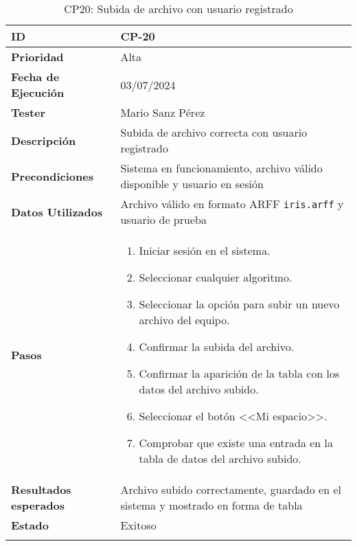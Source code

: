 \begin{longtable}{>{\raggedright\arraybackslash}p{4cm} p{9.5cm}}
    \hline
    \rowcolor{gray!20}
    \textbf{ID} & CP-20\\
    \hline
    \rowcolor{white}
    \textbf{Prioridad} & Alta \\
    \hline
    \rowcolor{gray!20}
    \textbf{Fecha de Ejecución} & 03/07/2024 \\
    \hline
    \rowcolor{white}
    \textbf{Tester} & Mario Sanz Pérez \\
    \hline
    \rowcolor{gray!20}
    \textbf{Descripción} & Subida de archivo correcta con usuario registrado\\
    \hline
    \rowcolor{white}
    \textbf{Precondiciones} & Sistema en funcionamiento, archivo válido disponible y usuario en sesión\\
    \hline
    \rowcolor{white}
    \textbf{Datos Utilizados} & Archivo válido en formato ARFF \texttt{iris.arff} y usuario de prueba\\
    \hline
    \rowcolor{gray!20}
    \textbf{Pasos} & \begin{enumerate}
        \item Iniciar sesión en el sistema.
        \item Seleccionar cualquier algoritmo.
        \item Seleccionar la opción para subir un nuevo archivo del equipo.
        \item Confirmar la subida del archivo.
        \item Confirmar la aparición de la tabla con los datos del archivo subido.
        \item Seleccionar el botón <<Mi espacio>>.
        \item Comprobar que existe una entrada en la tabla de datos del archivo subido.
    \end{enumerate}\\
	\hline
    \rowcolor{gray!20}
    \textbf{Resultados esperados} & Archivo subido correctamente, guardado en el sistema y mostrado en forma de tabla\\
    \hline
    \rowcolor{white}
    \textbf{Estado} & Exitoso\\
    \hline
	\caption[CP20: Subida de archivo con usuario registrado]{CP20: Subida de archivo con usuario registrado}
\end{longtable}

